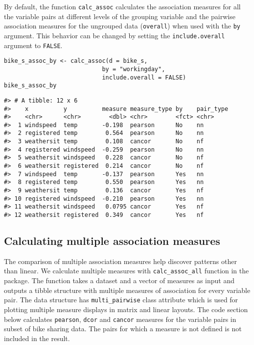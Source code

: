 By default, the function \texttt{calc\_assoc} calculates the association measures for all the variable pairs at different levels of the grouping variable and the pairwise association measures for the ungrouped data (\texttt{overall}) when used with the \texttt{by} argument. This behavior can be changed by setting the \texttt{include.overall} argument to \texttt{FALSE}.

\begin{verbatim}
bike_s_assoc_by <- calc_assoc(d = bike_s,
                            by = "workingday",
                            include.overall = FALSE)
bike_s_assoc_by
\end{verbatim}

\begin{verbatim}
#> # A tibble: 12 x 6
#>    x          y          measure measure_type by    pair_type
#>    <chr>      <chr>        <dbl> <chr>        <fct> <chr>    
#>  1 windspeed  temp       -0.198  pearson      No    nn       
#>  2 registered temp        0.564  pearson      No    nn       
#>  3 weathersit temp        0.108  cancor       No    nf       
#>  4 registered windspeed  -0.259  pearson      No    nn       
#>  5 weathersit windspeed   0.228  cancor       No    nf       
#>  6 weathersit registered  0.214  cancor       No    nf       
#>  7 windspeed  temp       -0.137  pearson      Yes   nn       
#>  8 registered temp        0.550  pearson      Yes   nn       
#>  9 weathersit temp        0.136  cancor       Yes   nf       
#> 10 registered windspeed  -0.210  pearson      Yes   nn       
#> 11 weathersit windspeed   0.0795 cancor       Yes   nf       
#> 12 weathersit registered  0.349  cancor       Yes   nf
\end{verbatim}

\hypertarget{calculating-multiple-association-measures}{%
\subsection{Calculating multiple association measures}\label{calculating-multiple-association-measures}}

The comparison of multiple association measures help discover patterns other than linear. We calculate multiple measures with \texttt{calc\_assoc\_all} function in the package. The function takes a dataset and a vector of measures as input and outputs a tibble structure with multiple measures of association for every variable pair. The data structure has \texttt{multi\_pairwise} class attribute which is used for plotting multiple measure displays in matrix and linear layouts. The code section below calculates \texttt{pearson}, \texttt{dcor} and \texttt{cancor} measures for the variable pairs in subset of bike sharing data. The pairs for which a measure is not defined is not included in the result.


